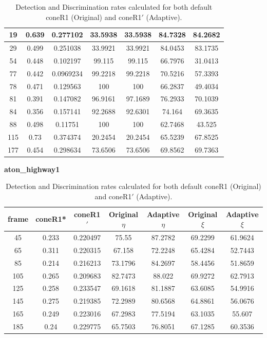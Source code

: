 \begin{appendices}
\begin{table}
\begin{tabular}{ |c|c|c|c|c|c|c| }
\hline
19 &  0.639 &  0.277102 &  33.5938 &  33.5938 &  84.7328 &  84.2682 \\
\hline
29 &  0.499 &  0.251038 &  33.9921 &  33.9921 &  84.0453 &  83.1735 \\
\hline
54 &  0.448 &  0.102197 &  99.115 &  99.115 &  66.7976 &  31.0413 \\
\hline
77 &  0.442 &  0.0969234 &  99.2218 &  99.2218 &  70.5216 &  57.3393 \\
\hline
78 &  0.471 &  0.129563 &  100 &  100 &  66.2837 &  49.4034 \\
\hline
81 &  0.391 &  0.147082 &  96.9161 &  97.1689 &  76.2933 &  70.1039 \\
\hline
84 &  0.356 &  0.157141 &  92.2688 &  92.6301 &  74.164 &  69.3635 \\
\hline
88 &  0.498 &  0.11751 &  100 &  100 &  62.7468 &  43.525 \\
\hline
115 &  0.73 &  0.374374 &  20.2454 &  20.2454 &  65.5239 &  67.8525 \\
\hline
177 &  0.454 &  0.298634 &  73.6506 &  73.6506 &  69.8562 &  69.7363 \\

\hline
\end{tabular}
\caption*{Detection and Discrimination rates calculated for both default coneR1 (Original) and coneR1$'$ (Adaptive).}
\end{table}

\begin{table}
\centering
\caption{\textbf{aton\_highway1}}
\begin{tabular}{ |c|c|c|c|c|c|c| }
\hline
\textbf{frame} &  \textbf{coneR1*} &  \textbf{coneR1$'$} &  \textbf{Original $\eta$} &  \textbf{Adaptive $\eta$} &  \textbf{Original $\xi$} &  \textbf{Adaptive $\xi$} \\
\hline
\hline
45 &  0.233 &  0.220497 &  75.55 &  87.2782 &  69.2299 &  61.9624 \\
\hline
65 &  0.311 &  0.220315 &  67.158 &  72.2248 &  65.4284 &  52.7443 \\
\hline
85 &  0.214 &  0.216213 &  73.1796 &  84.2697 &  58.4456 &  51.8659 \\
\hline
105 &  0.265 &  0.209683 &  82.7473 &  88.022 &  69.9272 &  62.7913 \\
\hline
125 &  0.258 &  0.233547 &  69.1618 &  81.1887 &  63.6085 &  54.9916 \\
\hline
145 &  0.275 &  0.219385 &  72.2989 &  80.6568 &  64.8861 &  56.0676 \\
\hline
165 &  0.249 &  0.223016 &  67.2983 &  77.5194 &  63.1035 &  55.607 \\
\hline
185 &  0.24 &  0.229775 &  65.7503 &  76.8051 &  67.1285 &  60.3536 \\
\hline
\end{tabular}
\caption*{Detection and Discrimination rates calculated for both default coneR1 (Original) and coneR1$'$ (Adaptive).}
\end{table}


\end{appendices}
